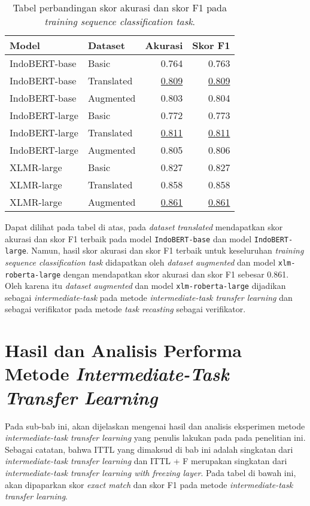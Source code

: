 \begin{table}[H]\centering
\begin{tabular}{llrr}
\toprule
         Model &    Dataset &  Akurasi &  Skor F1 \\
\midrule
 IndoBERT-base &      Basic &    0.764 &    0.763 \\
 IndoBERT-base & Translated &    \underline{0.809} &    \underline{0.809} \\
 IndoBERT-base &  Augmented &    0.803 &    0.804 \\
\hline
IndoBERT-large &      Basic &    0.772 &    0.773 \\
IndoBERT-large & Translated &    \underline{0.811} &    \underline{0.811} \\
IndoBERT-large &  Augmented &    0.805 &    0.806 \\
\hline
    XLMR-large &      Basic &    0.827 &    0.827 \\
    XLMR-large & Translated &    0.858 &    0.858 \\
    XLMR-large &  Augmented &    \underline{0.861} &    \underline{0.861} \\
\bottomrule
\end{tabular}
\caption{Tabel perbandingan skor akurasi dan skor F1 pada \emph{training sequence classification task}.}
\end{table}

Dapat dilihat pada tabel di atas, pada \emph{dataset} \emph{translated} mendapatkan skor akurasi dan skor F1 terbaik pada model \texttt{IndoBERT-base} dan model \texttt{IndoBERT-large}. Namun, hasil skor akurasi dan skor F1 terbaik untuk keseluruhan \emph{training sequence classification task} didapatkan oleh \emph{dataset} \emph{augmented} dan model \texttt{xlm-roberta-large} dengan mendapatkan skor akurasi dan skor F1 sebesar 0.861. Oleh karena itu \emph{dataset} \emph{augmented} dan model \texttt{xlm-roberta-large} dijadikan sebagai \emph{intermediate-task} pada metode \emph{intermediate-task transfer learning} dan sebagai verifikator pada metode \emph{task recasting} sebagai verifikator.

\section{Hasil dan Analisis Performa Metode \emph{Intermediate-Task Transfer Learning}}
\label{5.3}
Pada sub-bab ini, akan dijelaskan mengenai hasil dan analisis eksperimen metode \emph{intermediate-task transfer learning} yang penulis lakukan pada pada penelitian ini. Sebagai catatan, bahwa ITTL yang dimaksud di bab ini adalah singkatan dari \emph{intermediate-task transfer learning} dan ITTL + F merupakan singkatan dari \emph{intermediate-task transfer learning with freezing layer}. Pada tabel di bawah ini, akan dipaparkan skor \emph{exact match} dan skor F1 pada metode \emph{intermediate-task transfer learning}.


